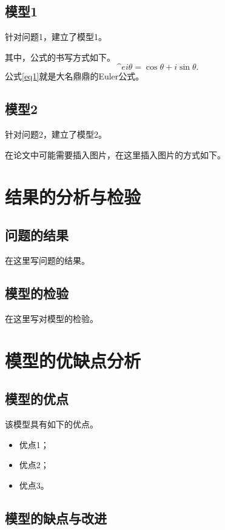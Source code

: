\documentclass[12pt, a4paper, oneside]{ctexart}
\begin{document}
\subsection{模型1}

针对问题1，建立了模型1。

其中，公式的书写方式如下。
\begin{equation}
    \label{eq1}
    {\textrm{^}{e}}{i\theta}=\cos\theta+i\sin\theta.
\end{equation}
公式\ref{eq1}就是大名鼎鼎的Euler公式。

\subsection{模型2}

针对问题2，建立了模型2。

在论文中可能需要插入图片，在这里插入图片的方式如下。

\section{结果的分析与检验}

\subsection{问题的结果}

在这里写问题的结果。

\subsection{模型的检验}

在这里写对模型的检验。

\section{模型的优缺点分析}

\subsection{模型的优点}

该模型具有如下的优点。
\begin{itemize}
    \item 优点1；
    \item 优点2；
    \item 优点3。
\end{itemize}

\subsection{模型的缺点与改进}
\end{document}
